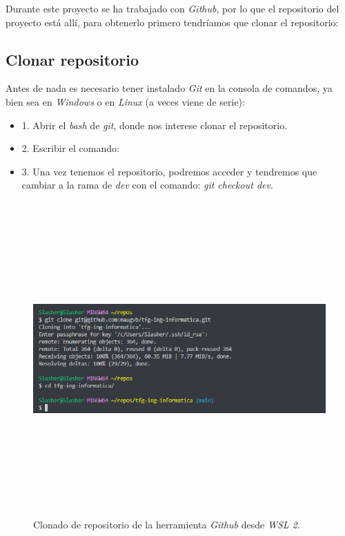 Durante este proyecto se ha trabajado con \textit{Github}, por lo que el repositorio del proyecto está allí, para obtenerlo primero tendríamos que clonar el repositorio:

\subsection{Clonar repositorio}

Antes de nada es necesario tener instalado \textit{Git} en la consola de comandos, ya bien sea en \textit{Windows} o en \textit{Linux} (a veces viene de serie):

\begin{itemize}
    \item 1. Abrir el \textit{bash} de \textit{git}, donde nos interese clonar el repositorio.
    \item 2. Escribir el comando: 
    \item 3. Una vez tenemos el repositorio, podremos acceder y tendremos que cambiar a la rama de \textit{dev} con el comando: \textit{git checkout dev}.
\end{itemize}
\FloatBarrier
\begin{figure}[h]
    \centering
    \includegraphics[width=12cm,height=12cm,keepaspectratio]{img/git.png}
    \caption{Clonado de repositorio de la herramienta \textit{Github} desde \textit{WSL 2}.}
    \label{fig:Flujo de navegabilidad de los usuarios por las páginas}
\end{figure}
\FloatBarrier


